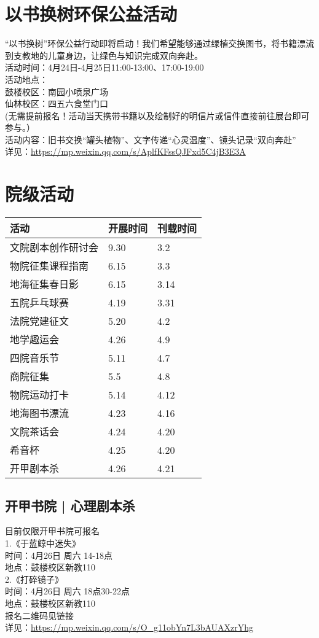 \documentclass[letterpaper, 12pt]{article}
\begin{document}
\begin{multicols}{2}
\section{以书换树环保公益活动} %
“以书换树”环保公益行动即将启动！我们希望能够通过绿植交换图书，将书籍漂流到支教地的儿童身边，让绿色与知识完成双向奔赴。
\\活动时间：4月24日-4月25日11:00-13:00、17:00-19:00
\\活动地点：
\\鼓楼校区：南园小喷泉广场 
\\仙林校区：四五六食堂门口 
\\(无需提前报名！活动当天携带书籍以及绘制好的明信片或信件直接前往展台即可参与。）
\\活动内容：旧书交换“罐头植物”、文字传递“心灵温度”、镜头记录“双向奔赴”
\\详见：\url{https://mp.weixin.qq.com/s/AplfKFssQJFxd5C4jB3E3A}

\section{院级活动}
\begin{tabular}{|>{\centering\arraybackslash}m{}|m{}|m{}|}
\hline
    活动 & 开展时间 & 刊载时间\\
    \hline\hline
    文院剧本创作研讨会 & 9.30 & 3.2\\
    物院征集课程指南 & 6.15 & 3.3\\
    地海征集春日影 & 6.15 & 3.14\\
    五院乒乓球赛 & 4.19 & 3.31\\
    法院党建征文 & 5.20 & 4.2\\
    地学趣运会 & 4.26 & 4.9\\
    四院音乐节 & 5.11 & 4.7\\
    商院征集 & 5.5 & 4.8\\
    物院运动打卡 & 5.14 & 4.12\\
    地海图书漂流 & 4.23 & 4.16\\
    文院茶话会 & 4.24 & 4.20\\
    希音杯 & 4.25 & 4.20\\
    开甲剧本杀 & 4.26 & 4.21\\

    \hline
\end{tabular}
\subsection{开甲书院 | 心理剧本杀} %
目前仅限开甲书院可报名
\\1.《于蓝鲸中迷失》
\\时间：4月26日 周六 14-18点
\\地点：鼓楼校区新教110
\\2.《打碎镜子》
\\时间：4月26日 周六 18点30-22点
\\地点：鼓楼校区新教110
\\报名二维码见链接
\\详见：\url{https://mp.weixin.qq.com/s/O_g11obYn7L3bAUAXzrYhg}


\end{multicols}
\end{document}
